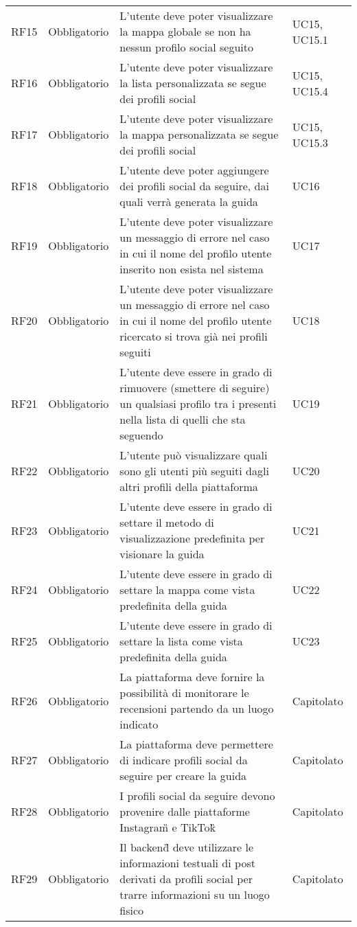 {\begin{longtable}{C{.15\freewidth} C{.2\freewidth} C{.528\freewidth} C{.15\freewidth}}
      RF15 & Obbligatorio & L'utente deve poter visualizzare la mappa globale se non ha nessun profilo social seguito & UC15, UC15.1 \\
      RF16 & Obbligatorio & L'utente deve poter visualizzare la lista personalizzata se segue dei profili social & UC15, UC15.4 \\
      RF17 & Obbligatorio & L'utente deve poter visualizzare la mappa personalizzata se segue dei profili social & UC15, UC15.3 \\
      RF18 & Obbligatorio & L'utente deve poter aggiungere dei profili social da seguire, dai quali verrà generata la guida & UC16 \\
      RF19 & Obbligatorio & L'utente deve poter visualizzare un messaggio di errore nel caso in cui il nome del profilo utente inserito non esista nel sistema & UC17 \\
      RF20 & Obbligatorio & L'utente deve poter visualizzare un messaggio di errore nel caso in cui il nome del profilo utente ricercato si trova già nei profili seguiti & UC18 \\
      RF21 & Obbligatorio & L'utente deve essere in grado di rimuovere (smettere di seguire) un qualsiasi profilo tra i presenti nella lista di quelli che sta seguendo  & UC19 \\
      RF22 & Obbligatorio & L'utente può visualizzare quali sono gli utenti più seguiti dagli altri profili della piattaforma & UC20 \\
      RF23 & Obbligatorio & L'utente deve essere in grado di settare il metodo di visualizzazione predefinita per visionare la guida & UC21 \\
      RF24 & Obbligatorio & L'utente deve essere in grado di settare la mappa come vista predefinita della guida & UC22 \\
      RF25 & Obbligatorio & L'utente deve essere in grado di settare la lista come vista predefinita della guida & UC23 \\	
      RF26 & Obbligatorio & La piattaforma deve fornire la possibilità di monitorare le recensioni partendo da un luogo indicato & Capitolato \\
      RF27 & Obbligatorio & La piattaforma deve permettere di indicare profili social da seguire per creare la guida & Capitolato \\
      RF28 & Obbligatorio & I profili social da seguire devono provenire dalle piattaforme Instagram\G{} e TikTok\G{} & Capitolato \\   
      RF29 & Obbligatorio & Il backend\G{} deve utilizzare le informazioni testuali di post derivati da profili social per trarre informazioni su un luogo fisico & Capitolato \\

\end{longtable}}
